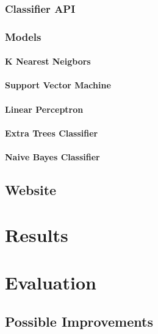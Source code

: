 \documentclass[a4paper,11pt]{report}
\begin{document}
\begin{itemize}
\begin{itemize}
\subsection{Classifier API}

\subsection{Models}
\subsubsection{K Nearest Neigbors}
\subsubsection{Support Vector Machine}
\subsubsection{Linear Perceptron}
\subsubsection{Extra Trees Classifier}
\subsubsection{Naive Bayes Classifier}

\section{Website}
\chapter{Results}
\label{chap:results}

\chapter{Evaluation}
\label{chap:evaluation}
\section{Possible Improvements}


\end{itemize}
\end{itemize}
\end{document}
